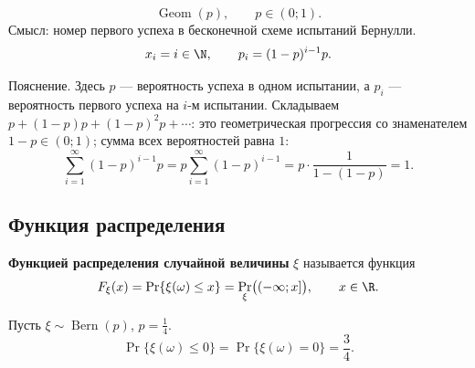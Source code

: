 \begin{definition}
    \[
        \operatorname{Geom}(p),\qquad p\in(0;1).
    \]
    Смысл: номер первого успеха в бесконечной схеме испытаний Бернулли.
    \[
        x_i=i\in\N,\qquad p_i=(1-p)^{i-1}p.
    \]
\end{definition}

\begingroup
\small
\setlength{\abovedisplayskip}{6pt}
\setlength{\belowdisplayskip}{6pt}
\noindent Пояснение.
Здесь $p$ --- вероятность успеха в одном испытании,
а $p_i$ --- вероятность первого успеха на $i$-м испытании.
Складываем $p+(1-p)p+(1-p)^2p+\cdots$:
это геометрическая прогрессия со знаменателем $1-p\in(0;1)$;
сумма всех вероятностей равна $1$:
\[
    \sum_{i=1}^{\infty}(1-p)^{i-1}p
    =p\sum_{i=1}^{\infty}(1-p)^{i-1}
    =p\cdot\frac1{1-(1-p)}=1.
\]
\par\endgroup

\subsection{Функция распределения}

\begin{definition}
    \textbf{Функцией распределения случайной величины} $\xi$
    называется функция
    \[
        F_\xi(x)=\Pr\{\xi(\omega)\leq x\}
        =\Pr_\xi\bigl((-\infty;x]\bigr),\qquad x\in\R.
    \]
\end{definition}

\begingroup
{}
\begin{example}
    Пусть $\xi\sim\operatorname{Bern}(p)$, $p=\frac14$.
    \[
        \Pr\{\xi(\omega)\leq0\}
        =\Pr\{\xi(\omega)=0\}=\frac34.
    \]
    \begin{center}
    \end{center}
\end{example}
\endgroup

